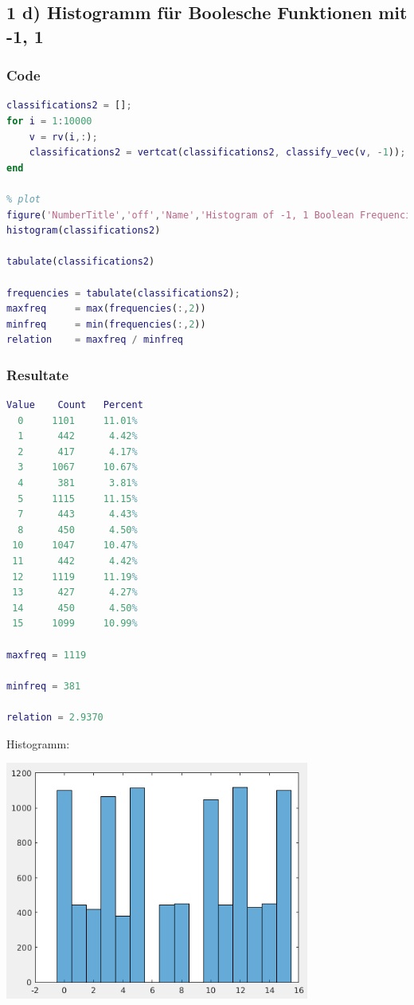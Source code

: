 \documentclass[12pt]{article}
\begin{document}
\subsection{1 d) Histogramm f\"ur Boolesche Funktionen mit -1, 1}
\subsubsection{Code}
\begin{lstlisting}[language=Matlab]
classifications2 = [];
for i = 1:10000
    v = rv(i,:);
    classifications2 = vertcat(classifications2, classify_vec(v, -1));  % classify v using -1, 1 as boolean values
end

% plot
figure('NumberTitle','off','Name','Histogram of -1, 1 Boolean Frequencies');
histogram(classifications2)

tabulate(classifications2)

frequencies = tabulate(classifications2);
maxfreq     = max(frequencies(:,2))
minfreq     = min(frequencies(:,2))
relation    = maxfreq / minfreq
\end{lstlisting}
\subsubsection{Resultate}
\begin{lstlisting}[language=Matlab]
Value    Count   Percent
  0     1101     11.01%
  1      442      4.42%
  2      417      4.17%
  3     1067     10.67%
  4      381      3.81%
  5     1115     11.15%
  7      443      4.43%
  8      450      4.50%
 10     1047     10.47%
 11      442      4.42%
 12     1119     11.19%
 13      427      4.27%
 14      450      4.50%
 15     1099     10.99%

maxfreq = 1119

minfreq = 381

relation = 2.9370
\end{lstlisting}
\newpage
Histogramm:\\
\begin{center}
\includegraphics[width=10cm]{rel_freq_hist-11.png}
\end{center}
\end{document}
